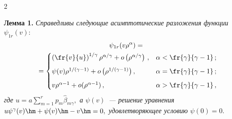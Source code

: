 \begin{multicols}{2}
\smallskip

\noindent
\textbf{Лемма 1.} \textit{Справедливы следующие асимптотические разложения функции 
$\psi_{1r}(v):$
\begin{multline}
\label{8}
\psi_{1r}(v\rho^{\alpha})
={}\\
{}=\begin{cases}
\left(\fr{v}{u}\right)^{{1}/{\gamma}}\rho^{{\alpha}/{\gamma}}+o\left(\rho^{{\alpha}/{\gamma}}\right)\,,&\alpha<\fr{\gamma}{\gamma-1}\,;
\\[6pt]
\psi(v)\rho^{{1}/({\gamma-1})}+o\left(\rho^{{1}/({\gamma-1})}\right),&\alpha=\fr{\gamma}{\gamma-1}\,;\\[6pt]
v\rho^{\alpha-1}+o(\rho^{\alpha-1})\,,&\alpha>\fr{\gamma}{\gamma-1}\,,
\end{cases}
\end{multline}
где $u=a\sum\limits_{m=1}^rp_m\hat{\beta}_{m\gamma},$ а $\psi(v)$~--- решение 
уравнения $u\psi^{\gamma}(v)\hm+\psi(v)\hm-v\hm=0,$ удовлетворяющее
условию} $\psi(0)=0.$

\smallskip


\end{multicols}
